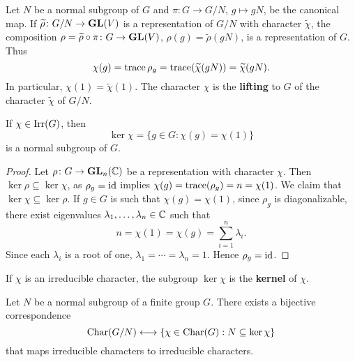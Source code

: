 Let $N$ be a normal subgroup of $G$ 
and $\pi\colon G\to G/N$, $g\mapsto gN$, be the canonical map. 
If $\widetilde{\rho}\colon G/N\to\mathbf{GL}(V)$ 
is a representation of $G/N$ with 
character
$\widetilde{\chi}$, the composition 
$\rho=\widetilde{\rho}\circ\pi\colon G\to \mathbf{GL}(V)$, $\rho(g)=\widetilde{\rho}(gN)$, 
is a representation of $G$. 
Thus
\[
\chi(g)=\operatorname{trace}{\rho_g}=\operatorname{trace}(\widetilde{\chi}(gN))=\widetilde{\chi}(gN).
\]
In particular, $\chi(1)=\widetilde{\chi}(1)$. The character $\chi$ 
is the \textbf{lifting} to $G$ of the character 
$\widetilde{\chi}$ of $G/N$. 

\begin{proposition}
If $\chi\in\operatorname{Irr}(G)$, then 
\[
\ker\chi=\{g\in G:\chi(g)=\chi(1)\}
\]
is a normal subgroup of $G$. 
\end{proposition}

\begin{proof}
Let $\rho\colon G\to\mathbf{GL}_n(\mathbb{C})$ be a representation with character $\chi$. Then 
$\ker\rho\subseteq\ker\chi$, as $\rho_g=\operatorname{id}$ implies 
$\chi(g)=\operatorname{trace}(\rho_g)=n=\chi(1)$. We claim that  
$\ker\chi\subseteq\ker\rho$. If $g\in G$ is such that $\chi(g)=\chi(1)$, since 
$\rho_g$ is diagonalizable, there exist eigenvalues $\lambda_1,\dots,\lambda_n\in\mathbb{C}$ such that
\[
n=\chi(1)=\chi(g)=\sum_{i=1}^n\lambda_i.
\]
Since each $\lambda_i$ is a root of one,  
$\lambda_1=\cdots=\lambda_n=1$. Hence $\rho_g=\operatorname{id}$. 
\end{proof}

If $\chi$ is an irreducible character, the subgroup $\ker\chi$ 
is the \textbf{kernel} of $\chi$. 

\begin{theorem}
Let $N$ be a normal subgroup of a finite group $G$. There exists
a bijective correspondence 
\[
\operatorname{Char}(G/N) \longleftrightarrow \{\chi\in\operatorname{Char}(G): 
N\subseteq\ker\chi\}
\]
that maps irreducible characters to irreducible characters.
\end{theorem}

